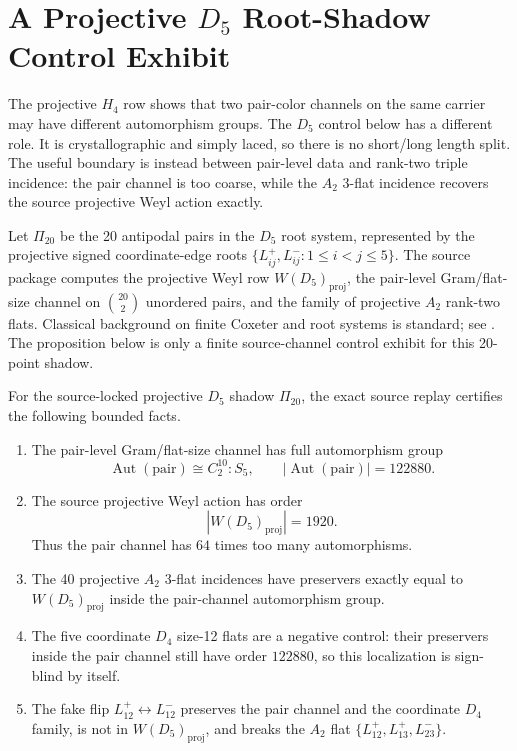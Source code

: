 \section{A Projective \texorpdfstring{\(D_5\)}{D5} Root-Shadow Control Exhibit}
\label{sec:d5-root-shadow-control}

The projective \(H_4\) row shows that two pair-color channels on the same carrier may have different automorphism groups.  The \(D_5\) control below has a different role.  It is crystallographic and simply laced, so there is no short/long length split.  The useful boundary is instead between pair-level data and rank-two triple incidence: the pair channel is too coarse, while the \(A_2\) 3-flat incidence recovers the source projective Weyl action exactly.

Let \(\Pi_{20}\) be the 20 antipodal pairs in the \(D_5\) root system, represented by the projective signed coordinate-edge roots \(\{L_{ij}^{+},L_{ij}^{-}:1\leq i<j\leq5\}\).  The source package computes the projective Weyl row \(W(D_5)_{\mathrm{proj}}\), the pair-level Gram/flat-size channel on \(\binom{20}{2}\) unordered pairs, and the family of projective \(A_2\) rank-two flats.  Classical background on finite Coxeter and root systems is standard; see \cite{BjornerBrenti2005}.  The proposition below is only a finite source-channel control exhibit for this 20-point shadow.

\begin{proposition}
\label{prop:d5-root-shadow-control}
For the source-locked projective \(D_5\) shadow \(\Pi_{20}\), the exact source replay certifies the following bounded facts.
\begin{enumerate}[label=\textup{(\alph*)},leftmargin=*]
  \item The pair-level Gram/flat-size channel has full automorphism group
  \[
    \operatorname{Aut}(\mathrm{pair})\cong C_2^{10}:S_5,
    \qquad |\operatorname{Aut}(\mathrm{pair})|=122880.
  \]
  \item The source projective Weyl action has order
  \[
    |W(D_5)_{\mathrm{proj}}|=1920.
  \]
  Thus the pair channel has \(64\) times too many automorphisms.
  \item The 40 projective \(A_2\) 3-flat incidences have preservers exactly equal to \(W(D_5)_{\mathrm{proj}}\) inside the pair-channel automorphism group.
  \item The five coordinate \(D_4\) size-12 flats are a negative control: their preservers inside the pair channel still have order \(122880\), so this localization is sign-blind by itself.
  \item The fake flip \(L_{12}^{+}\leftrightarrow L_{12}^{-}\) preserves the pair channel and the coordinate \(D_4\) family, is not in \(W(D_5)_{\mathrm{proj}}\), and breaks the \(A_2\) flat \(\{L_{12}^{+},L_{13}^{+},L_{23}^{-}\}\).
\end{enumerate}
\end{proposition}

